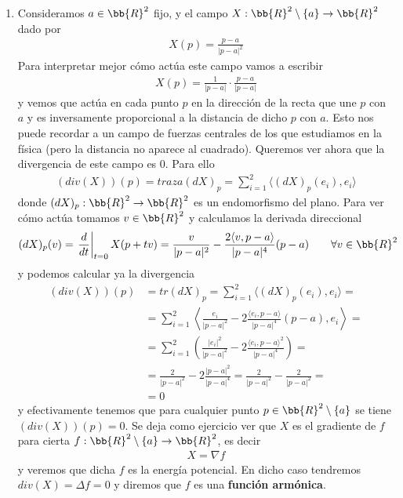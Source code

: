 \begin{observacion}
\begin{enumerate}[start=4]
        \item Consideramos $a\in \bb{R}^2$ fijo, y el campo $X:\bb{R}^2 \setminus \{a\}\to \bb{R}^2$ dado por 
        \begin{gather*}
            X(p)=\frac{p-a}{|p-a|^2}
        \end{gather*}
        Para interpretar mejor cómo actúa este campo vamos a escribir
        \begin{gather*}
            X(p)= \frac{1}{|p-a|} \cdot \frac{p-a}{|p-a|}
        \end{gather*}
        y vemos que actúa en cada punto $p$ en la dirección de la recta que une $p$ con $a$ y es inversamente proporcional a la distancia de dicho $p$ con $a$. Esto nos puede recordar a un campo de fuerzas centrales de los que estudiamos en la física (pero la distancia no aparece al cuadrado). Queremos ver ahora que la divergencia de este campo es $0$. Para ello
        \begin{gather*}
            (div(X))(p) = traza(dX)_p = \sum_{i=1}^2 \langle (dX)_p(e_i), e_i \rangle
        \end{gather*}
        donde $(dX)_p:\bb{R}^2\to \bb{R}^2$ es un endomorfismo del plano. Para ver cómo actúa tomamos $v\in \bb{R}^2$ y calculamos la derivada direccional
        \begin{gather*}
            (dX)_p(v) = \left.\frac{d}{dt}\right|_{t=0} X(p+tv) = \frac{v}{|p-a|^2} - \frac{2\langle v, p-a \rangle}{|p-a|^4}(p-a) \qquad \forall v \in \bb{R}^2
        \end{gather*}
        y podemos calcular ya la divergencia
        \begin{align*}
            (div(X))(p) &= tr(dX)_p = \sum_{i=1}^2 \langle (dX)_p(e_i), e_i \rangle =\\
            &= \sum_{i=1}^2 \left\langle \frac{e_i}{|p-a|^2}-2\frac{\langle e_i, p-a \rangle}{|p-a|^4}(p-a), e_i \right\rangle =\\
            &= \sum_{i=1}^2 \left(\frac{|e_i|^2}{|p-a|^2} - 2\frac{\langle e_i, p-a\rangle^2}{|p-a|^4}\right) =\\
            &= \frac{2}{|p-a|^2} - 2 \frac{|p-a|^2}{|p-a|^4} = \frac{2}{|p-a|^2} - \frac{2}{|p-a|^2} =\\
            &= 0
        \end{align*}
        y efectivamente tenemos que para cualquier punto $p\in \bb{R}^2 \setminus \{a\}$ se tiene $(div(X))(p)=0$. Se deja como ejercicio ver que $X$ es el gradiente de $f$ para cierta $f:\bb{R}^2\setminus\{a\} \to \bb{R}^2$, es decir
        \begin{gather*}
            X = \nabla f
        \end{gather*}
        y veremos que dicha $f$ es la energía potencial. En dicho caso tendremos $div(X)=\Delta f=0$ y diremos que $f$ es una \textbf{función armónica}.\\


\end{enumerate}
\end{observacion}
